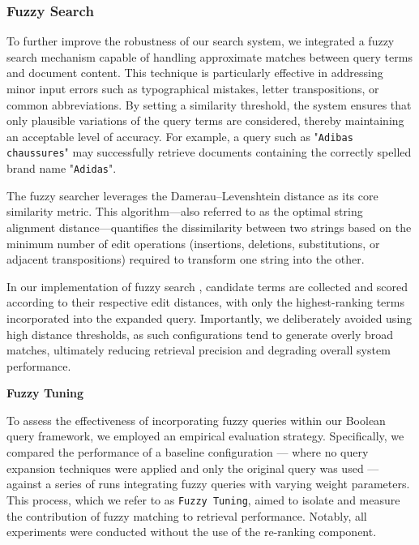 \subsubsection{Fuzzy Search}
\label{subsubsec:fuzzy}
To further improve the robustness of our search system, we integrated a fuzzy search mechanism capable of handling approximate matches between query terms and document content. This technique is particularly effective in addressing minor input errors such as typographical mistakes, letter transpositions, or common abbreviations. By setting a similarity threshold, the system ensures that only plausible variations of the query terms are considered, thereby maintaining an acceptable level of accuracy. For example, a query such as "\texttt{Adibas chaussures}" may successfully retrieve documents containing the correctly spelled brand name "\texttt{Adidas}".

The fuzzy searcher leverages the Damerau–Levenshtein distance as its core similarity metric. This algorithm—also referred to as the optimal string alignment distance—quantifies the dissimilarity between two strings based on the minimum number of edit operations (insertions, deletions, substitutions, or adjacent transpositions) required to transform one string into the other.

In our implementation of fuzzy search \cite{luceneFuzzyQuery2024}, candidate terms are collected and scored according to their respective edit distances, with only the highest-ranking terms incorporated into the expanded query. Importantly, we deliberately avoided using high distance thresholds, as such configurations tend to generate overly broad matches, ultimately reducing retrieval precision and degrading overall system performance.
\vspace{\baselineskip}

\textbf{Fuzzy Tuning}

To assess the effectiveness of incorporating fuzzy queries within our Boolean query framework, we employed an empirical evaluation strategy. Specifically, we compared the performance of a baseline configuration — where no query expansion techniques were applied and only the original query was used — against a series of runs integrating fuzzy queries with varying weight parameters. This process, which we refer to as \texttt{Fuzzy Tuning}, aimed to isolate and measure the contribution of fuzzy matching to retrieval performance. Notably, all experiments were conducted without the use of the re-ranking component.

